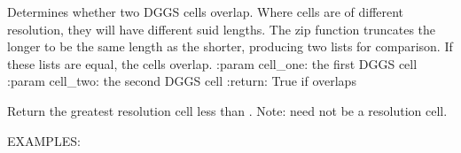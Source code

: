 \documentclass[a4paper,12ptopenany,oneside,english]{sphinxmanual}
\begin{document}
\begin{fulllineitems}

\begin{fulllineitems}
\label{\detokenize{dggs:rhealpixdggs.dggs.Cell.overlaps}}
\pysigstartsignatures
{}
\pysigstopsignatures
\sphinxAtStartPar
Determines whether two DGGS cells overlap.
Where cells are of different resolution, they will have different suid lengths. The zip function truncates the longer
to be the same length as the shorter, producing two lists for comparison. If these lists are equal, the cells overlap.
:param cell\_one: the first DGGS cell
:param cell\_two: the second DGGS cell
:return: True if overlaps

\end{fulllineitems}


\begin{fulllineitems}
\label{\detokenize{dggs:rhealpixdggs.dggs.Cell.predecessor}}
\pysigstartsignatures
{}
\pysigstopsignatures
\sphinxAtStartPar
Return the greatest resolution  cell less than .
Note:  need not be a resolution  cell.

\sphinxAtStartPar
EXAMPLES:

\begin{sphinxVerbatim}[commandchars=\\\{\}]
     
\end{sphinxVerbatim}


\end{fulllineitems}
\end{fulllineitems}
\end{document}
